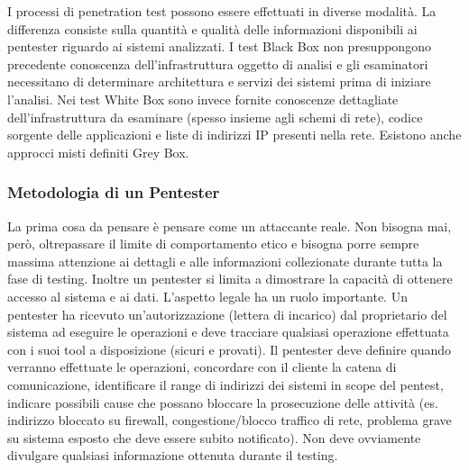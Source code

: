 I processi di penetration test possono essere effettuati in diverse modalità. La differenza consiste sulla quantità e qualità delle informazioni disponibili ai pentester riguardo ai sistemi analizzati. I test Black Box non presuppongono precedente conoscenza dell'infrastruttura oggetto di analisi e gli esaminatori necessitano di determinare architettura e servizi dei sistemi prima di iniziare l'analisi. Nei test White Box sono invece fornite conoscenze dettagliate dell'infrastruttura da esaminare (spesso insieme agli schemi di rete), codice sorgente delle applicazioni e liste di indirizzi IP presenti nella rete. Esistono anche approcci misti definiti Grey Box.

\subsubsection{Metodologia di un Pentester}
La prima cosa da pensare è pensare come un attaccante reale. Non bisogna mai, però, oltrepassare il limite di comportamento etico e bisogna porre sempre massima attenzione ai dettagli e alle informazioni collezionate durante tutta la fase di testing. Inoltre un pentester si limita a dimostrare la capacità di ottenere accesso al sistema e ai dati.  L'aspetto legale ha un ruolo importante. Un pentester ha ricevuto un'autorizzazione (lettera di incarico) dal proprietario del sistema ad eseguire le operazioni e deve tracciare qualsiasi operazione effettuata con i suoi tool a disposizione (sicuri e provati). Il pentester deve definire quando verranno effettuate le operazioni, concordare con il cliente la catena di comunicazione, identificare il range di indirizzi dei sistemi in scope del pentest,  indicare possibili cause che possano bloccare la prosecuzione delle attività (es. indirizzo bloccato su firewall, congestione/blocco traffico di rete, problema grave su sistema esposto che deve essere subito
notificato). Non deve ovviamente divulgare qualsiasi informazione ottenuta durante il testing. 

